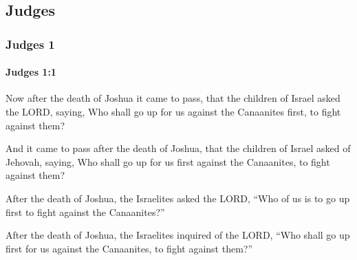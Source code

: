 \subsection{Judges}
	\label{JUDGES}

	\subsubsection{Judges 1} %
		\label{JUDGES-1}

		\paragraph{Judges 1:1} %
			\label{JUDGES-1-1}

			Now after the death of Joshua it came to pass, that the children of Israel asked the LORD, saying, Who shall go up for us against the Canaanites first, to fight against them?

			\begin{versebox}
					\item[BHS] 
					\item[ASV] And it came to pass after the death of Joshua, that the children of Israel asked of Jehovah, saying, Who shall go up for us first against the Canaanites, to fight against them?
					\item[NIV] After the death of Joshua, the Israelites asked the LORD, “Who of us is to go up first to fight against the Canaanites?”
					\item[NRSV] After the death of Joshua, the Israelites inquired of the LORD, “Who shall go up first for us against the Canaanites, to fight against them?”
			\end{versebox}

